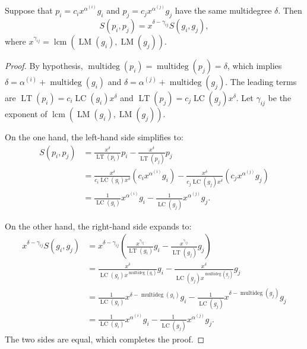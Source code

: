 \begin{lemma}\label{lem:S-polynomials_and_Monomial_Multiplication} %
  \leanok 
  Suppose that $p_i = c_i x^{\alpha^{(i)}} g_i$ and $p_j = c_j x^{\alpha^{(j)}} g_j$ have the same multidegree $\delta$. Then
  \[
  S(p_i, p_j) = x^{\delta - \gamma_{ij}} S(g_i, g_j),
  \]
  where $x^{\gamma_{ij}} = \operatorname{lcm}(\operatorname{LM}(g_i), \operatorname{LM}(g_j))$.
\end{lemma}
\begin{proof}
  \leanok
  By hypothesis, $\operatorname{multideg}(p_i) = \operatorname{multideg}(p_j) = \delta$, which implies $\delta = \alpha^{(i)} + \operatorname{multideg}(g_i)$ and $\delta = \alpha^{(j)} + \operatorname{multideg}(g_j)$.
  The leading terms are $\operatorname{LT}(p_i) = c_i \operatorname{LC}(g_i) x^\delta$ and $\operatorname{LT}(p_j) = c_j \operatorname{LC}(g_j) x^\delta$.
  Let $\gamma_{ij}$ be the exponent of $\operatorname{lcm}(\operatorname{LM}(g_i), \operatorname{LM}(g_j))$.

  On the one hand, the left-hand side simplifies to:
  \begin{align*}
  S(p_i, p_j) &= \frac{x^\delta}{\operatorname{LT}(p_i)} p_i - \frac{x^\delta}{\operatorname{LT}(p_j)} p_j \\
  &= \frac{x^\delta}{c_i \operatorname{LC}(g_i) x^\delta} (c_i x^{\alpha^{(i)}} g_i) - \frac{x^\delta}{c_j \operatorname{LC}(g_j) x^\delta} (c_j x^{\alpha^{(j)}} g_j) \\
  &= \frac{1}{\operatorname{LC}(g_i)} x^{\alpha^{(i)}} g_i - \frac{1}{\operatorname{LC}(g_j)} x^{\alpha^{(j)}} g_j.
  \end{align*}

  On the other hand, the right-hand side expands to:
  \begin{align*}
  x^{\delta - \gamma_{ij}} S(g_i, g_j)
  &= x^{\delta - \gamma_{ij}} \left( \frac{x^{\gamma_{ij}}}{\operatorname{LT}(g_i)} g_i - \frac{x^{\gamma_{ij}}}{\operatorname{LT}(g_j)} g_j \right) \\
  &= \frac{x^{\delta}}{\operatorname{LC}(g_i)x^{\operatorname{multideg}(g_i)}} g_i - \frac{x^{\delta}}{\operatorname{LC}(g_j)x^{\operatorname{multideg}(g_j)}} g_j \\
  &= \frac{1}{\operatorname{LC}(g_i)} x^{\delta - \operatorname{multideg}(g_i)} g_i - \frac{1}{\operatorname{LC}(g_j)} x^{\delta - \operatorname{multideg}(g_j)} g_j \\
  &= \frac{1}{\operatorname{LC}(g_i)} x^{\alpha^{(i)}} g_i - \frac{1}{\operatorname{LC}(g_j)} x^{\alpha^{(j)}} g_j.
  \end{align*}
  The two sides are equal, which completes the proof.
\end{proof}

